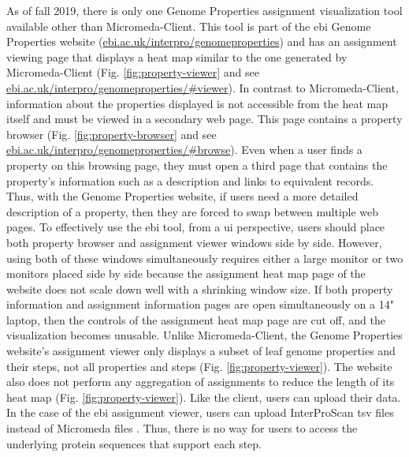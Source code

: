 As of fall 2019, there is only one Genome Properties assignment visualization 
tool available other than Micromeda-Client. This tool is part of the \gls{ebi} 
Genome Properties website \cite{richardson2018genome} 
(\href{http://www.ebi.ac.uk/interpro/genomeproperties}{ebi.ac.uk/interpro/genomeproperties}) 
and has an assignment viewing page that displays a heat map similar to the one 
generated by Micromeda-Client \cite{richardson2018genome} (Fig. 
\ref{fig:property-viewer} and see 
\href{http://www.ebi.ac.uk/interpro/genomeproperties/#viewer}{ebi.ac.uk/interpro/genomeproperties/\#viewer}). 
In contrast to Micromeda-Client, information about the properties displayed is 
not accessible from the heat map itself and must be viewed in a secondary web 
page. This page contains a property browser (Fig. \ref{fig:property-browser} and 
see 
\href{http://www.ebi.ac.uk/interpro/genomeproperties/#browse}{ebi.ac.uk/interpro/genomeproperties/\#browse}). 
Even when a user finds a property on this browsing page, they must open a third 
page that contains the property's information such as a description and links to 
equivalent records. Thus, with the Genome Properties website, if users need a 
more detailed description of a property, then they are forced to swap between 
multiple web pages. To effectively use the \gls{ebi} tool, from a \gls{ui} 
perspective, users should place both property browser and assignment viewer 
windows side by side. However, using both of these windows simultaneously 
requires either a large monitor or two monitors placed side by side because the 
assignment heat map page of the website does not scale down well with a 
shrinking window size. If both property information and assignment information 
pages are open simultaneously on a 14" laptop, then the controls of the 
assignment heat map page are cut off, and the visualization becomes unusable. 
Unlike Micromeda-Client, the Genome Properties website's assignment viewer only 
displays a subset of leaf genome properties and their steps, not all properties 
and steps (Fig. \ref{fig:property-viewer}). The website also does not perform 
any aggregation of assignments to reduce the length of its heat map (Fig. 
\ref{fig:property-viewer}). Like the client, users can upload their data. In the 
case of the \gls{ebi} assignment viewer, users can upload InterProScan \gls{tsv} 
files instead of Micromeda files \cite{richardson2018genome}. Thus, there is no 
way for users to access the underlying protein sequences that support each step.

